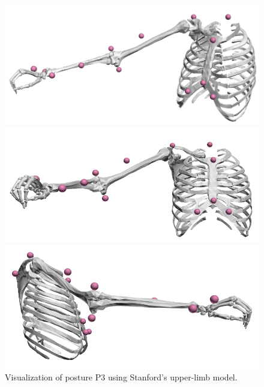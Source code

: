 \begin{figure}[!htb]
    \centering
    \captionsetup{justification=centering}
    \begin{minipage}{0.3\linewidth}
        \centering
        \includegraphics[trim={0 0 0 0}, clip, width=1\linewidth]{img/chapter_5/posture3_3D.png}
    \end{minipage}
    \hfill
    \begin{minipage}{0.3\linewidth}
        \captionsetup{justification=centering}
        \centering
        \includegraphics[trim={0 0 0 0}, clip, width=1\linewidth]{img/chapter_5/posture3_coronal.png}
    \end{minipage}
    \hfill
    \begin{minipage}{0.3\linewidth}
        \captionsetup{justification=centering}
        \centering
        \includegraphics[trim={0 0 0 0}, clip, width=0.9\linewidth]{img/chapter_5/posture3_sagittal.png}
    \end{minipage}
    \caption{Visualization of posture P3 using Stanford's upper-limb model.}
    \label{fig:exp_pose3}
\end{figure}

